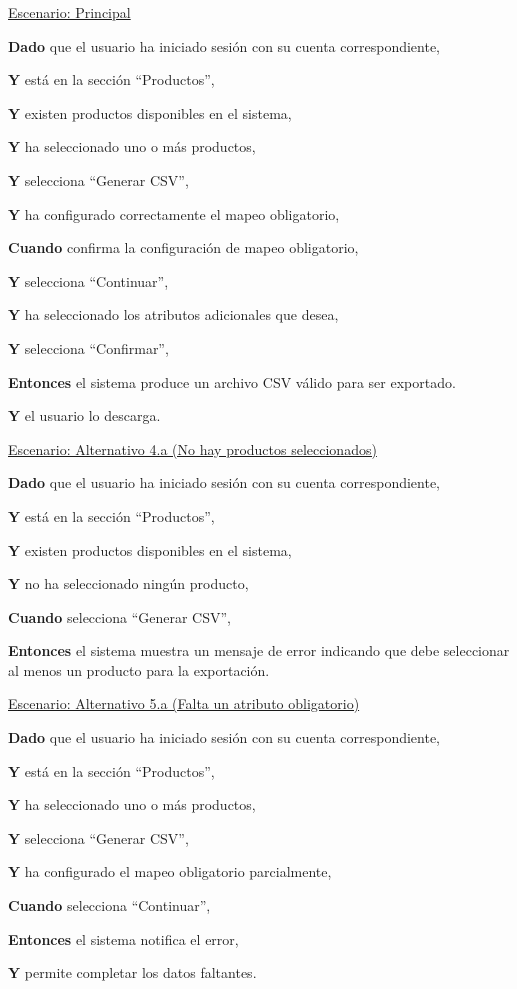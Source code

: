 \underline{Escenario: Principal}\par
\vspace{0.15cm}
\textbf{Dado} que el usuario ha iniciado sesión con su cuenta correspondiente,\par
\textbf{Y} está en la sección \enquote{Productos},\par
\textbf{Y} existen productos disponibles en el sistema,\par
\textbf{Y} ha seleccionado uno o más productos,\par
\textbf{Y} selecciona \enquote{Generar CSV},\par
\textbf{Y} ha configurado correctamente el mapeo obligatorio,\par
\textbf{Cuando} confirma la configuración de mapeo obligatorio,\par
\textbf{Y} selecciona \enquote{Continuar},\par
\textbf{Y} ha seleccionado los atributos adicionales que desea,\par
\textbf{Y} selecciona \enquote{Confirmar},\par
\textbf{Entonces} el sistema produce un archivo CSV válido para ser exportado.\par
\textbf{Y} el usuario lo descarga.\par
\vspace{0.20cm}

\underline{Escenario: Alternativo 4.a (No hay productos seleccionados)}\par
\vspace{0.15cm}
\textbf{Dado} que el usuario ha iniciado sesión con su cuenta correspondiente,\par
\textbf{Y} está en la sección \enquote{Productos},\par
\textbf{Y} existen productos disponibles en el sistema,\par
\textbf{Y} no ha seleccionado ningún producto,\par
\textbf{Cuando} selecciona \enquote{Generar CSV},\par
\textbf{Entonces} el sistema muestra un mensaje de error indicando que debe seleccionar al menos un producto para la exportación.\par
\vspace{0.20cm}

\underline{Escenario: Alternativo 5.a (Falta un atributo obligatorio)}\par
\textbf{Dado} que el usuario ha iniciado sesión con su cuenta correspondiente,\par
\textbf{Y} está en la sección \enquote{Productos},\par
\textbf{Y} ha seleccionado uno o más productos,\par
\textbf{Y} selecciona \enquote{Generar CSV},\par
\textbf{Y} ha configurado el mapeo obligatorio parcialmente,\par
\textbf{Cuando} selecciona \enquote{Continuar},\par
\textbf{Entonces} el sistema notifica el error,\par
\textbf{Y} permite completar los datos faltantes.\par
\vspace{0.20cm}

